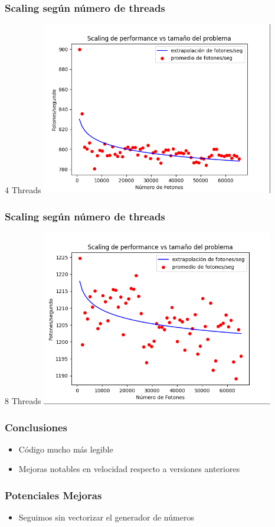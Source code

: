 \documentclass{beamer}
\begin{document}
    \begin{frame}
        \frametitle{Scaling según número de threads}
        4 Threads
        \includegraphics[width=4in]{imagenes/scaling_4threads_alv.png}
    \end{frame}

    \begin{frame}
        \frametitle{Scaling según número de threads}
        8 Threads
        \includegraphics[width=4in]{imagenes/scaling_8threads_alv.png}
    \end{frame}

    \begin{frame}
        \frametitle{Conclusiones}
        \begin{itemize}
            \item Código mucho más legible
            \item Mejoras notables en velocidad respecto a versiones anteriores
        \end{itemize}
    \end{frame}

    \begin{frame}
        \frametitle{Potenciales Mejoras}
        \begin{itemize}
            \item Seguimos sin vectorizar el generador de números
        \end{itemize}
    \end{frame}
\end{document}
